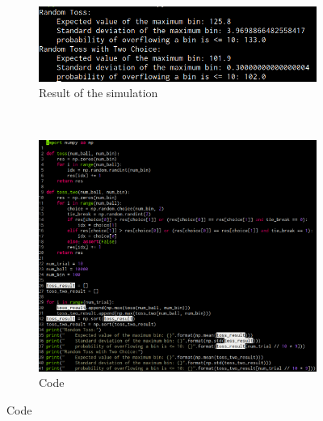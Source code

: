 \documentclass[a4paper]{article}
\begin{document}
\begin{figure} [b]
	\centering
	\begin{subfigure}[t]{0.45\textwidth}
        \includegraphics[width=\linewidth]{src/result.png}
      \caption{Result of the simulation}
    \end{subfigure}
    ~
    \begin{subfigure}[t]{0.45\textwidth}
        \includegraphics[width=\linewidth]{src/code.png}
        \caption{Code}
    \end{subfigure}
\end{figure} 
\end{document}
